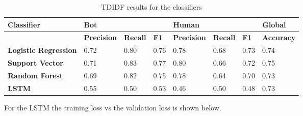 \documentclass[12pt]{article}
\begin{document}
\begin{table}[ht]
\begin{tabular}{|l|lll|lll|l|}
\hline
\textbf{Classifier}          & \multicolumn{3}{l|}{\textbf{Bot}}                                                          & \multicolumn{3}{l|}{\textbf{Human}}                                                            & \textbf{Global}   \\ \hline
\textbf{}                    & \multicolumn{1}{l|}{\textbf{Precision}} & \multicolumn{1}{l|}{\textbf{Recall}} & \textbf{F1} & \multicolumn{1}{l|}{\textbf{Precision}} & \multicolumn{1}{l|}{\textbf{Recall}} & \textbf{F1} & \textbf{Accuracy} \\ \hline
\textbf{Logistic Regression} & \multicolumn{1}{l|}{0.72}               & \multicolumn{1}{l|}{0.80}            & 0.76        & \multicolumn{1}{l|}{0.78}               & \multicolumn{1}{l|}{0.68}            & 0.73        & 0.74              \\ \hline
\textbf{Support Vector}      & \multicolumn{1}{l|}{0.71}               & \multicolumn{1}{l|}{0.83}            & 0.77        & \multicolumn{1}{l|}{0.80}               & \multicolumn{1}{l|}{0.66}            & 0.72        & 0.75              \\ \hline
\textbf{Random Forest}       & \multicolumn{1}{l|}{0.69}               & \multicolumn{1}{l|}{0.82}            & 0.75        & \multicolumn{1}{l|}{0.78}               & \multicolumn{1}{l|}{0.64}            & 0.70        & 0.73              \\ \hline
\textbf{LSTM}                & \multicolumn{1}{l|}{0.55}                   & \multicolumn{1}{l|}{0.50}                & 0.53 & \multicolumn{1}{l|}{0.46}                   & \multicolumn{1}{l|}{0.50}                &0.48             & 0.73             \\ \hline
\end{tabular}
\caption{TDIDF results for the classifiers}
\label{table:tdidf}
\end{table}
 For the LSTM the training loss vs the validation loss is shown below.
\end{document}
